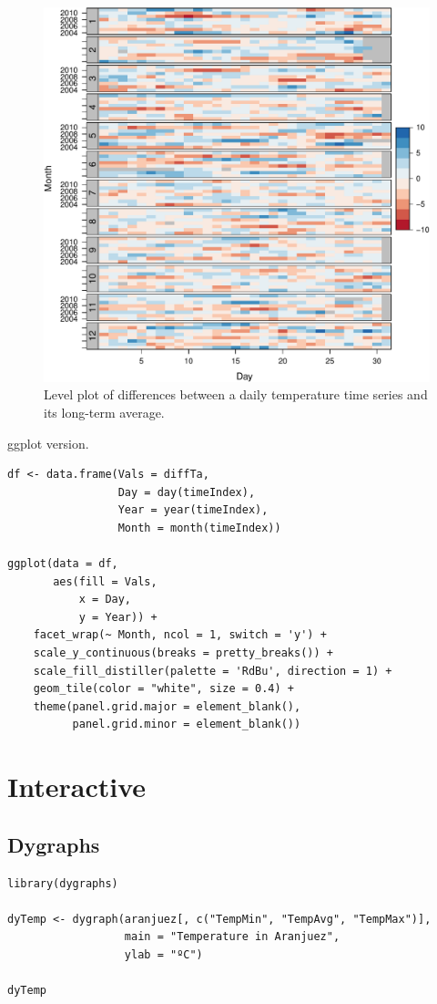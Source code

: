 \documentclass[smallroyalvopaper]{memoir}
\begin{document}
\begin{figure}[htbp]
\centering
\includegraphics[width=.9\linewidth]{figs/diffTa_levelplot.pdf}
\caption{Level plot of differences between a daily temperature time series and its long-term average. \label{fig:diffTa_level}}
\end{figure}

ggplot version.
\lstset{language=r,label= ,caption= ,captionpos=b,numbers=none}
\begin{lstlisting}
df <- data.frame(Vals = diffTa,
                 Day = day(timeIndex),
                 Year = year(timeIndex),
                 Month = month(timeIndex))

ggplot(data = df,
       aes(fill = Vals,
           x = Day,
           y = Year)) +
    facet_wrap(~ Month, ncol = 1, switch = 'y') +
    scale_y_continuous(breaks = pretty_breaks()) + 
    scale_fill_distiller(palette = 'RdBu', direction = 1) + 
    geom_tile(color = "white", size = 0.4) +
    theme(panel.grid.major = element_blank(),
          panel.grid.minor = element_blank())
\end{lstlisting}


\section{Interactive}
\label{sec:orgbc06b9a}

\subsection{Dygraphs \label{sec:dygraphs}}
\label{sec:orgaf87588}
\lstset{language=r,label= ,caption= ,captionpos=b,numbers=none}
\begin{lstlisting}
library(dygraphs)

dyTemp <- dygraph(aranjuez[, c("TempMin", "TempAvg", "TempMax")],
                  main = "Temperature in Aranjuez",
                  ylab = "ºC")

dyTemp
\end{lstlisting}
\end{document}
